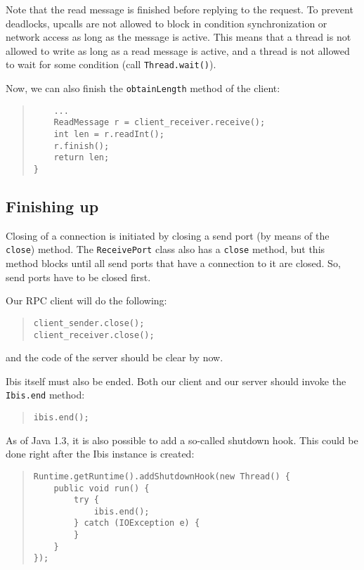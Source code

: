\documentclass[10pt]{article}
\begin{document}
Note that the read message is finished before replying to the
request. To prevent deadlocks, upcalls are not allowed to block in
condition synchronization or network access as long as the message
is active. This means that a thread is not allowed to write as long
as a read message is active, and a thread is not allowed to wait for
some condition (call \verb+Thread.wait()+).

Now, we can also finish the \verb+obtainLength+ method of the client:
\begin{quote}
\begin{verbatim}
    ...
    ReadMessage r = client_receiver.receive();
    int len = r.readInt();
    r.finish();
    return len;
}
\end{verbatim}
\end{quote}

\subsection{Finishing up}

Closing of a connection is initiated by closing a send port
(by means of the \verb+close+) method. The \verb+ReceivePort+
class also has a \verb+close+ method, but this method blocks
until all send ports that have a connection to it are closed.
So, send ports have to be closed first.

Our RPC client will do the following:

\begin{quote}
\begin{verbatim}
client_sender.close();
client_receiver.close();
\end{verbatim}
\end{quote}
and the code of the server should be clear by now.

Ibis itself must also be ended. Both our client and our server
should invoke the \verb+Ibis.end+ method:
\begin{quote}
\begin{verbatim}
ibis.end();
\end{verbatim}
\end{quote}

As of Java 1.3, it is also possible to add a so-called shutdown hook.
This could be done right after the Ibis instance is created:
\begin{quote}
\begin{verbatim}
Runtime.getRuntime().addShutdownHook(new Thread() {
    public void run() {
        try {
            ibis.end();
        } catch (IOException e) {
        }
    }
});
\end{verbatim}
\end{quote}
\end{document}
